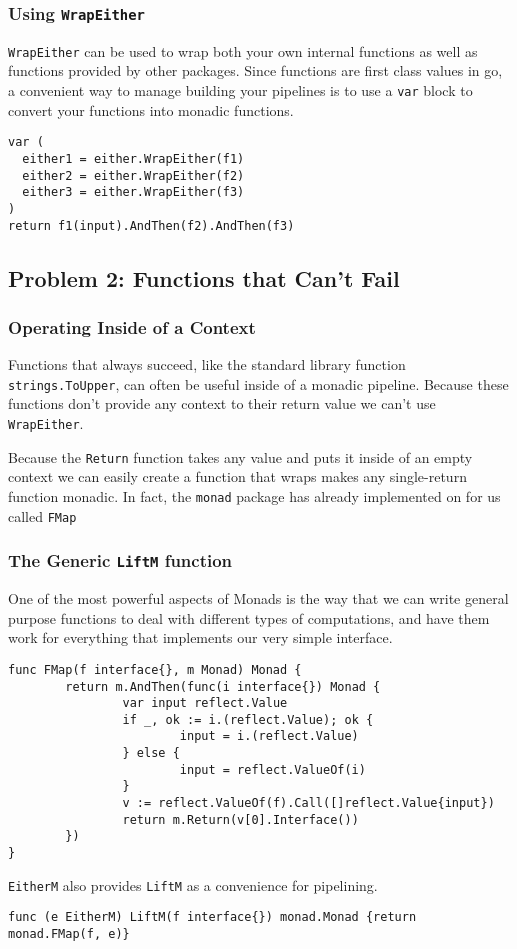 \documentclass{beamer}
\begin{document}
\begin{frame}[fragile]
  \frametitle{Using {\tt WrapEither}}
  {\tt WrapEither} can be used to wrap both your own internal
  functions as well as functions provided by other packages.  Since
  functions are first class values in go, a convenient way to manage
  building your pipelines is to use a {\tt var} block to convert your
  functions into monadic functions.
  \par\pause
\begin{lstlisting}[language=Golang]
var (
  either1 = either.WrapEither(f1)
  either2 = either.WrapEither(f2)
  either3 = either.WrapEither(f3)
)
return f1(input).AndThen(f2).AndThen(f3)
\end{lstlisting}
\end{frame}

\subsection{Problem 2: Functions that Can't Fail}

\begin{frame}[fragile]
  \frametitle{Operating Inside of a Context}
  Functions that always succeed, like the standard library function
  {\tt strings.ToUpper}, can often be useful inside of a monadic
  pipeline.  Because these functions don't provide any context to
  their return value we can't use {\tt WrapEither}.

  Because the {\tt Return} function takes any value and puts it inside
  of an empty context we can easily create a function that wraps makes
  any single-return function monadic. In fact, the {\tt monad} package
  has already implemented on for us called {\tt FMap}
\end{frame}

\begin{frame}[fragile]
  \frametitle{The Generic {\tt LiftM} function}
  One of the most powerful aspects of Monads is the way that we can
  write general purpose functions to deal with different types of
  computations, and have them work for everything that implements our
  very simple interface.
\begin{lstlisting}[language=Golang]
func FMap(f interface{}, m Monad) Monad {
        return m.AndThen(func(i interface{}) Monad {
                var input reflect.Value
                if _, ok := i.(reflect.Value); ok {
                        input = i.(reflect.Value)
                } else {
                        input = reflect.ValueOf(i)
                }
                v := reflect.ValueOf(f).Call([]reflect.Value{input})
                return m.Return(v[0].Interface())
        })
}
\end{lstlisting}

  {\tt EitherM} also provides {\tt LiftM} as a convenience for pipelining.
\begin{lstlisting}[language=Golang]
func (e EitherM) LiftM(f interface{}) monad.Monad {return monad.FMap(f, e)}
\end{lstlisting}
\end{frame}
\end{document}
